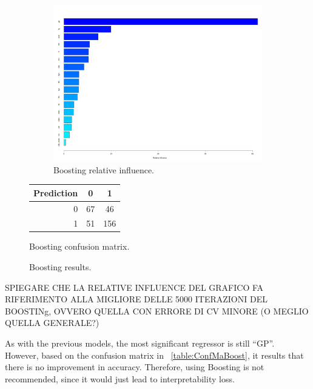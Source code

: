 \begin{figure}[H]
	\centering
	\begin{subfigure}{0.5\textwidth}
		\centering
		\includegraphics[width=0.6\linewidth]{ImageFiles/Classification/Trees/boost_4_rel_inf_best.pdf}
		\caption{Boosting relative influence.}
		\label{fig:boost_4_rel_inf}
	\end{subfigure}%
	\hfill
	\begin{subtable}[h]{0.5\textwidth}
		\centering
		\begin{tabular}{|| cr | cc ||}    
			\hline
			\multicolumn{2}{|c|}{Prediction} 
			& 0 & 1 \\
			\hline
			& 0 & 67 & 46 \\
			& 1 & 51 & 156 \\
			\hline
		\end{tabular}
		\caption{Boosting confusion matrix.}
		\label{table:ConfMaBoost}
	\end{subtable}
	\caption{Boosting results.}
	\label{BoostRes}
\end{figure}
SPIEGARE CHE LA RELATIVE INFLUENCE DEL GRAFICO FA RIFERIMENTO ALLA MIGLIORE DELLE 5000 ITERAZIONI DEL BOOSTINg, OVVERO QUELLA CON ERRORE DI CV MINORE (O MEGLIO QUELLA GENERALE?)

As with the previous models, the most significant regressor is still ``GP''. However, based on the confusion matrix in \Tab~\ref{table:ConfMaBoost}, it results that there is no improvement in accuracy. Therefore, using Boosting is not recommended, since it would just lead to interpretability loss.

